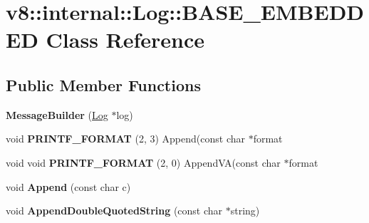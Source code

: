 \hypertarget{classv8_1_1internal_1_1_log_1_1_b_a_s_e___e_m_b_e_d_d_e_d}{}\section{v8\+:\+:internal\+:\+:Log\+:\+:B\+A\+S\+E\+\_\+\+E\+M\+B\+E\+D\+D\+ED Class Reference}
\label{classv8_1_1internal_1_1_log_1_1_b_a_s_e___e_m_b_e_d_d_e_d}
\subsection*{Public Member Functions}
\begin{DoxyCompactItemize}
\item 
{\bfseries Message\+Builder} (\hyperlink{classv8_1_1internal_1_1_log}{Log} $\ast$log)\hypertarget{classv8_1_1internal_1_1_log_1_1_b_a_s_e___e_m_b_e_d_d_e_d_a5cd1e2e5253b4bb18d76abd5b3be545f}{}\label{classv8_1_1internal_1_1_log_1_1_b_a_s_e___e_m_b_e_d_d_e_d_a5cd1e2e5253b4bb18d76abd5b3be545f}

\item 
void {\bfseries P\+R\+I\+N\+T\+F\+\_\+\+F\+O\+R\+M\+AT} (2, 3) Append(const char $\ast$format\hypertarget{classv8_1_1internal_1_1_log_1_1_b_a_s_e___e_m_b_e_d_d_e_d_a47385a5127f9394837f2705bc0f94595}{}\label{classv8_1_1internal_1_1_log_1_1_b_a_s_e___e_m_b_e_d_d_e_d_a47385a5127f9394837f2705bc0f94595}

\item 
void void {\bfseries P\+R\+I\+N\+T\+F\+\_\+\+F\+O\+R\+M\+AT} (2, 0) Append\+VA(const char $\ast$format\hypertarget{classv8_1_1internal_1_1_log_1_1_b_a_s_e___e_m_b_e_d_d_e_d_a7f3fb68df96ffb2f078eac6fcb7d2282}{}\label{classv8_1_1internal_1_1_log_1_1_b_a_s_e___e_m_b_e_d_d_e_d_a7f3fb68df96ffb2f078eac6fcb7d2282}

\item 
void {\bfseries Append} (const char c)\hypertarget{classv8_1_1internal_1_1_log_1_1_b_a_s_e___e_m_b_e_d_d_e_d_a5cfb7887d4ab3e292d0f662dee92a14b}{}\label{classv8_1_1internal_1_1_log_1_1_b_a_s_e___e_m_b_e_d_d_e_d_a5cfb7887d4ab3e292d0f662dee92a14b}

\item 
void {\bfseries Append\+Double\+Quoted\+String} (const char $\ast$string)\hypertarget{classv8_1_1internal_1_1_log_1_1_b_a_s_e___e_m_b_e_d_d_e_d_a27f32f415acfd6b4587d0444eb83adc2}{}\label{classv8_1_1internal_1_1_log_1_1_b_a_s_e___e_m_b_e_d_d_e_d_a27f32f415acfd6b4587d0444eb83adc2}


\end{DoxyCompactItemize}
